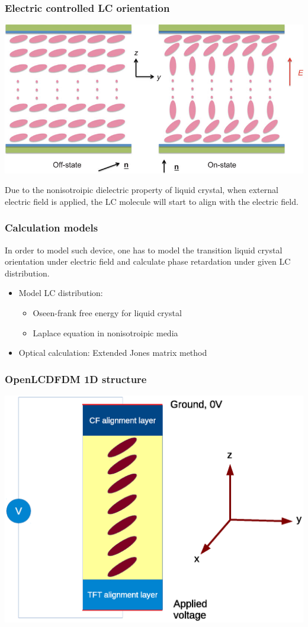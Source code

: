\documentclass{beamer}
\begin{document}
\begin{frame}
\frametitle{Electric controlled LC orientation}
\begin{center}
\includegraphics[scale=0.4]{ECB.jpg}
\end{center}
Due to the nonisotroipic dielectric property of liquid crystal, when external electric field is applied, the LC molecule will start to align with the electric field.
\end{frame}
\begin{frame}
\frametitle{Calculation models}
In order to model such device, one has to model the transition liquid crystal orientation under electric field and calculate phase retardation under given LC distribution.\\
\begin{itemize}
\item<1-> Model LC distribution:
\begin{itemize}
\item<1-> Oseen-frank free energy for liquid crystal
\item<1-> Laplace equation in nonisotroipic media
\end{itemize}
\item<1-> Optical calculation: Extended Jones matrix method
\end{itemize}
\end{frame}
\begin{frame}
\frametitle{OpenLCDFDM 1D structure}
\begin{center}
\includegraphics[scale=0.4]{OneDimension_Coordinate.eps}
\end{center}
\end{frame}
\end{document}
